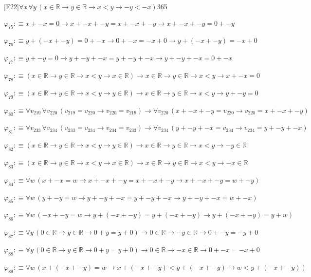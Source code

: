 \begin{fullproof}{[F22]}{$\forall x\,\forall y\,(x \in \mathbb{R} \to y \in \mathbb{R} \to x < y \to -y < -x)$}{365}
\begin{abbrevlist}
\item $\varphi_{75} :\equiv x + -x = 0 \to x + -x + -y = x + -x + -y \to x + -x + -y = 0 + -y$
\item $\varphi_{76} :\equiv y + (-x + -y) = 0 + -x \to 0 + -x = -x + 0 \to y + (-x + -y) = -x + 0$
\item $\varphi_{77} :\equiv y + -y = 0 \to y + -y + -x = y + -y + -x \to y + -y + -x = 0 + -x$
\item $\varphi_{78} :\equiv (x \in \mathbb{R} \to y \in \mathbb{R} \to x < y \to x \in \mathbb{R}) \to x \in \mathbb{R} \to y \in \mathbb{R} \to x < y \to x + -x = 0$
\item $\varphi_{79} :\equiv (x \in \mathbb{R} \to y \in \mathbb{R} \to x < y \to y \in \mathbb{R}) \to x \in \mathbb{R} \to y \in \mathbb{R} \to x < y \to y + -y = 0$
\item $\varphi_{80} :\equiv \forall v_{219}\,\forall v_{220}\,(v_{219} = v_{220} \to v_{220} = v_{219}) \to \forall v_{220}\,(x + -x + -y = v_{220} \to v_{220} = x + -x + -y)$
\item $\varphi_{81} :\equiv \forall v_{233}\,\forall v_{234}\,(v_{233} = v_{234} \to v_{234} = v_{233}) \to \forall v_{234}\,(y + -y + -x = v_{234} \to v_{234} = y + -y + -x)$
\item $\varphi_{82} :\equiv (x \in \mathbb{R} \to y \in \mathbb{R} \to x < y \to y \in \mathbb{R}) \to x \in \mathbb{R} \to y \in \mathbb{R} \to x < y \to -y \in \mathbb{R}$
\item $\varphi_{83} :\equiv (x \in \mathbb{R} \to y \in \mathbb{R} \to x < y \to x \in \mathbb{R}) \to x \in \mathbb{R} \to y \in \mathbb{R} \to x < y \to -x \in \mathbb{R}$
\item $\varphi_{84} :\equiv \forall w\,(x + -x = w \to x + -x + -y = x + -x + -y \to x + -x + -y = w + -y)$
\item $\varphi_{85} :\equiv \forall w\,(y + -y = w \to y + -y + -x = y + -y + -x \to y + -y + -x = w + -x)$
\item $\varphi_{86} :\equiv \forall w\,(-x + -y = w \to y + (-x + -y) = y + (-x + -y) \to y + (-x + -y) = y + w)$
\item $\varphi_{87} :\equiv \forall y\,(0 \in \mathbb{R} \to y \in \mathbb{R} \to 0 + y = y + 0) \to 0 \in \mathbb{R} \to -y \in \mathbb{R} \to 0 + -y = -y + 0$
\item $\varphi_{88} :\equiv \forall y\,(0 \in \mathbb{R} \to y \in \mathbb{R} \to 0 + y = y + 0) \to 0 \in \mathbb{R} \to -x \in \mathbb{R} \to 0 + -x = -x + 0$
\item $\varphi_{89} :\equiv \forall w\,(x + (-x + -y) = w \to x + (-x + -y) < y + (-x + -y) \to w < y + (-x + -y))$

\end{abbrevlist}
\end{fullproof}
